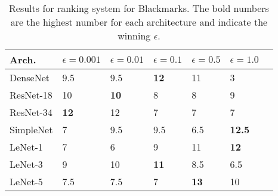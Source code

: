 \begin{table}
\small
    \centering
    \caption{Results for ranking system for Blackmarks. The bold numbers are the highest number for each architecture and indicate the winning $\epsilon$.}
    \begin{tabular}{|l|l|l|l|l|l|l|}
        \hline
        \textbf{Arch.} & $\epsilon=0.001$ & $\epsilon=0.01$  & $\epsilon=0.1$ & $\epsilon=0.5$ & $\epsilon=1.0$ \\ \hline
        DenseNet  & 9.5         & 9.5          & \textbf{12}  & 11          & 3             \\ \hline
        ResNet-18 & 10 & \textbf{10}  & 8            & 8           & 9             \\ \hline
        ResNet-34 & \textbf{12} & 12  & 7            & 7           & 7             \\ \hline
        SimpleNet & 7           & 9.5          & 9.5          & 6.5         & \textbf{12.5} \\ \hline
        LeNet-1   & 7           & 6            & 9            & 11          & \textbf{12}   \\ \hline
        LeNet-3   & 9           & 10           & \textbf{11}  & 8.5         & 6.5           \\ \hline
        LeNet-5   & 7.5         & 7.5          & 7            & \textbf{13} & 10            \\ \hline
    \end{tabular}
    \label{tab:blackmarks_ranking}
\end{table}